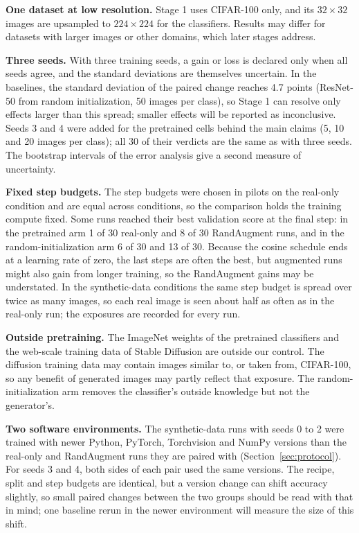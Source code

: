 \documentclass{scrartcl}
\begin{document}
\textbf{One dataset at low resolution.} Stage 1 uses CIFAR-100 only, and its $32\times32$ images are upsampled to $224\times224$ for the classifiers. Results may differ for datasets with larger images or other domains, which later stages address.

\textbf{Three seeds.} With three training seeds, a gain or loss is declared only when all seeds agree, and the standard deviations are themselves uncertain. In the baselines, the standard deviation of the paired change reaches 4.7 points (ResNet-50 from random initialization, 50 images per class), so Stage 1 can resolve only effects larger than this spread; smaller effects will be reported as inconclusive. Seeds 3 and 4 were added for the pretrained cells behind the main claims (5, 10 and 20 images per class); all 30 of their verdicts are the same as with three seeds. The bootstrap intervals of the error analysis give a second measure of uncertainty.

\textbf{Fixed step budgets.} The step budgets were chosen in pilots on the real-only condition and are equal across conditions, so the comparison holds the training compute fixed. Some runs reached their best validation score at the final step: in the pretrained arm 1 of 30 real-only and 8 of 30 RandAugment runs, and in the random-initialization arm 6 of 30 and 13 of 30. Because the cosine schedule ends at a learning rate of zero, the last steps are often the best, but augmented runs might also gain from longer training, so the RandAugment gains may be understated. In the synthetic-data conditions the same step budget is spread over twice as many images, so each real image is seen about half as often as in the real-only run; the exposures are recorded for every run.

\textbf{Outside pretraining.} The ImageNet weights of the pretrained classifiers and the web-scale training data of Stable Diffusion are outside our control. The diffusion training data may contain images similar to, or taken from, CIFAR-100, so any benefit of generated images may partly reflect that exposure. The random-initialization arm removes the classifier's outside knowledge but not the generator's.

\textbf{Two software environments.} The synthetic-data runs with seeds 0 to 2 were trained with newer Python, PyTorch, Torchvision and NumPy versions than the real-only and RandAugment runs they are paired with (Section~\ref{sec:protocol}). For seeds 3 and 4, both sides of each pair used the same versions. The recipe, split and step budgets are identical, but a version change can shift accuracy slightly, so small paired changes between the two groups should be read with that in mind; one baseline rerun in the newer environment will measure the size of this shift.
\end{document}

